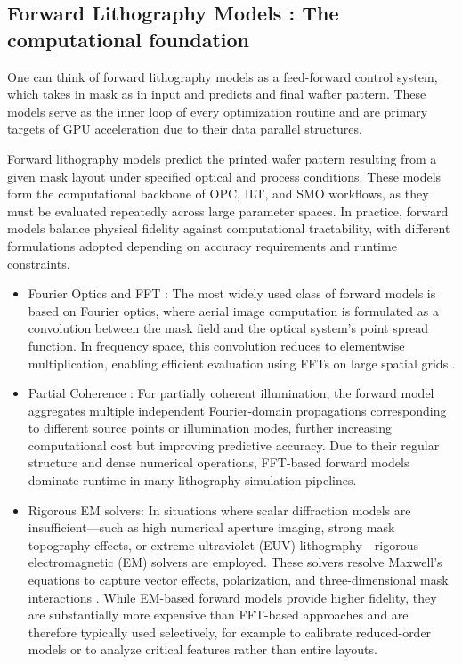 \documentclass[pdflatex,sn-mathphys-num]{sn-jnl}%
\theoremstyle{thmstyleone}%
\theoremstyle{thmstyletwo}%
\theoremstyle{thmstylethree}%
\begin{document}
\subsection{Forward Lithography Models : The computational foundation}
One can think of forward lithography models as a feed-forward control system, which takes in mask as in input and predicts and final wafter pattern. These models serve as the inner loop of every optimization routine and are primary targets of GPU acceleration due to their data parallel structures. 

Forward lithography models predict the printed wafer pattern resulting from a given mask layout under specified optical and process conditions. These models form the computational backbone of OPC, ILT, and SMO workflows, as they must be evaluated repeatedly across large parameter spaces. In practice, forward models balance physical fidelity against computational tractability, with different formulations adopted depending on accuracy requirements and runtime constraints.

\begin{itemize}
  \item Fourier Optics and FFT : The most widely used class of forward models is based on Fourier optics, where aerial image computation is formulated as a convolution between the mask field and the optical system’s point spread function. In frequency space, this convolution reduces to elementwise multiplication, enabling efficient evaluation using FFTs on large spatial grids \cite{Mack2007FundamentalPO,Hopkins88,Wong2001ResolutionET}. 
  \item Partial Coherence : For partially coherent illumination, the forward model aggregates multiple independent Fourier-domain propagations corresponding to different source points or illumination modes, further increasing computational cost but improving predictive accuracy. Due to their regular structure and dense numerical operations, FFT-based forward models dominate runtime in many lithography simulation pipelines.
  \item Rigorous EM solvers: In situations where scalar diffraction models are insufficient—such as high numerical aperture imaging, strong mask topography effects, or extreme ultraviolet (EUV) lithography—rigorous electromagnetic (EM) solvers are employed. These solvers resolve Maxwell’s equations to capture vector effects, polarization, and three-dimensional mask interactions \cite{Wong2001ResolutionET}. While EM-based forward models provide higher fidelity, they are substantially more expensive than FFT-based approaches and are therefore typically used selectively, for example to calibrate reduced-order models or to analyze critical features rather than entire layouts.
\end{itemize}
\end{document}
